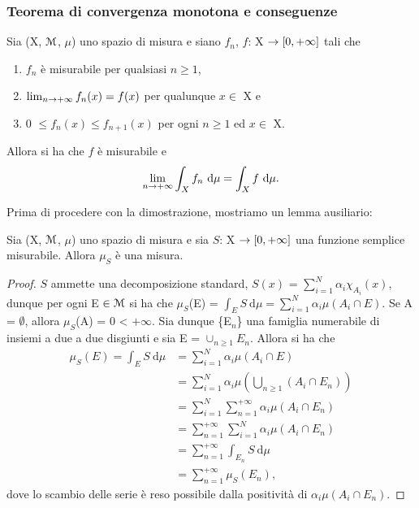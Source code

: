 \documentclass[Completo.tex]{subfiles}
\begin{document}
\subsubsection{Teorema di convergenza monotona e conseguenze}
\begin{eTh}
	Sia (X, $\eu[M]$, $\mu$) uno spazio di misura e siano $f_n$, $f$: X $\rightarrow [0, +\infty]$ tali che
	\begin{enumerate}
		\item $f_n$ è misurabile per qualsiasi $n \geq 1$, 
		\item $\lim_{n \rightarrow +\infty} f_n(x) = f(x)$ per qualunque $x \in$ X e
		\item 0 $\leq f_n(x) \leq f_{n+1}(x)$ per ogni $n \geq 1$ ed $x \in$ X.
	\end{enumerate}
	Allora si ha che $f$ è misurabile e
	\begin{equation*}
	\lim_{n \rightarrow +\infty} \int_X f_n \ \mathrm{d}\mu = \int_X f \ \mathrm{d}\mu.
	\end{equation*}
\end{eTh}
Prima di procedere con la dimostrazione, mostriamo un lemma ausiliario:
\begin{eTh}
	Sia (X, $\eu[M]$, $\mu$) uno spazio di misura e sia $S$: X $\rightarrow [0, +\infty]$ una funzione semplice misurabile. Allora $\mu_S$ è una misura.
\end{eTh}
\begin{proof}
	$S$ ammette una decomposizione standard, $S(x)$ = $\sum_{i = 1}^{N} \alpha_i \chi_{A_i}(x)$, dunque per ogni E $\in \eu[M]$ si ha che $\mu_S$(E) = $\int_E S \ \mathrm{d}\mu = \sum_{i = 1}^{N} \alpha_i \mu(A_i \cap E)$. Se A = $\emptyset$, allora $\mu_S$(A) = 0 < $+\infty$. Sia dunque \{E$_n$\} una famiglia numerabile di insiemi a due a due disgiunti e sia E = $\cup_{n\geq1} E_n$. Allora si ha che
	\begin{align*}
	\mu_S(E) = \int_E S \ \mathrm{d}\mu &= \sum_{i = 1}^{N} \alpha_i \mu(A_i \cap E) \\
	&= \sum_{i = 1}^{N} \alpha_i \mu\left(\bigcup_{n\geq1}(A_i \cap E_n)\right) \\
	&= \sum_{i = 1}^{N} \sum_{n=1}^{+\infty} \alpha_i \mu(A_i \cap E_n) \\
	&= \sum_{n=1}^{+\infty} \sum_{i=1}^{N} \alpha_i \mu(A_i \cap E_n) \\
	&= \sum_{n=1}^{+\infty} \int_{E_n} S \ \mathrm{d}\mu \\
	&= \sum_{n=1}^{+\infty} \mu_S(E_n),
	\end{align*}
	dove lo scambio delle serie è reso possibile dalla positività di $\alpha_i \mu(A_i \cap E_n)$.
\end{proof}
\end{document}
